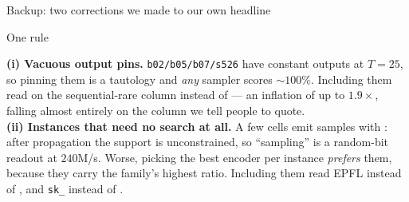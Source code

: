 \begin{frame}{Backup: two corrections we made to our own headline}
  \begin{block}{One rule}
    \centering
  \end{block}
  \vspace{0.4em}
  \small
  \textbf{(i) Vacuous output pins.} \texttt{b02/b05/b07/s526} have constant outputs at $T{=}25$, so
  pinning them is a tautology and \emph{any} sampler scores ${\sim}100\%$. Including them read
  \bad{$47.7\times$} on the sequential-rare column instead of \good{$36.5\times$} --- an inflation
  of up to $1.9\times$, falling almost entirely on the column we tell people to quote.
  \\[0.6em]
  \textbf{(ii) Instances that need no search at all.} A few cells emit samples with : after propagation the support is unconstrained, so ``sampling''
  is a random-bit readout at $240$M/s. Worse, picking the best encoder per instance
  \emph{prefers} them, because they carry the family's highest ratio. Including them read EPFL
  \bad{$12.7\times$} instead of \good{$6.4\times$}, and \texttt{sk\_} \bad{$48.5\times$} instead of
  \good{$46.2\times$}.
  \\[0.6em]
\end{frame}

